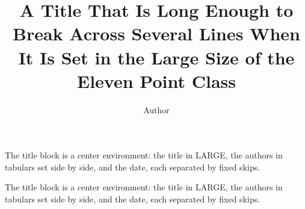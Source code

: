 \documentclass[11pt]{article}
\title{A Title That Is Long Enough to Break Across Several Lines When It Is Set in the Large Size of the Eleven Point Class}
\author{Author}
\date{}
\begin{document}
\maketitle
The title block is a center environment: the title in LARGE, the authors in tabulars set side by side, and the date, each separated by fixed skips.

The title block is a center environment: the title in LARGE, the authors in tabulars set side by side, and the date, each separated by fixed skips.
\end{document}
